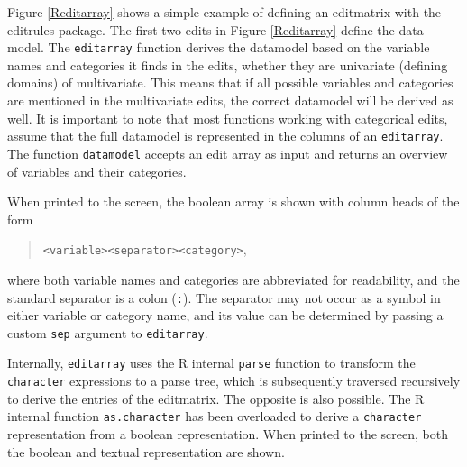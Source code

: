 \documentclass[11pt, fleqn, a4paper]{article}
\begin{document}
Figure \ref{Reditarray} shows a simple example of defining an editmatrix with
the editrules package.  The first two edits in Figure \ref{Reditarray} define
the data model. The {\tt editarray} function derives the datamodel based on the
variable names and categories it finds in the edits, whether they are
univariate (defining domains) of multivariate. This means that if all possible
variables and categories are mentioned in the multivariate edits, the correct
datamodel will be derived as well. It is important to note that most functions
working with categorical edits, assume that the full datamodel is represented
in the columns of an {\tt editarray}. The function {\tt datamodel} accepts an
edit array as input and returns an overview of variables and their categories.

When printed to the screen, the boolean array is shown with column heads of the form
\begin{quote}
{\tt <variable><separator><category>}, 
\end{quote}
where both variable names and categories are abbreviated for readability, and
the standard separator is a colon ({\tt :}). The separator may not occur as a
symbol in either variable or category name, and its value can be determined by
passing a custom {\tt sep} argument to {\tt editarray}.

Internally, {\tt editarray} uses the {\sf R} internal {\tt parse} function to
transform the {\tt character} expressions to a parse tree, which is
subsequently traversed recursively to derive the entries of the editmatrix. The
opposite is also possible. The {\sf R} internal function {\tt as.character} has
been overloaded to derive a {\tt character} representation from a boolean
representation. When printed to the screen, both the boolean and textual
representation are shown.
\end{document}
